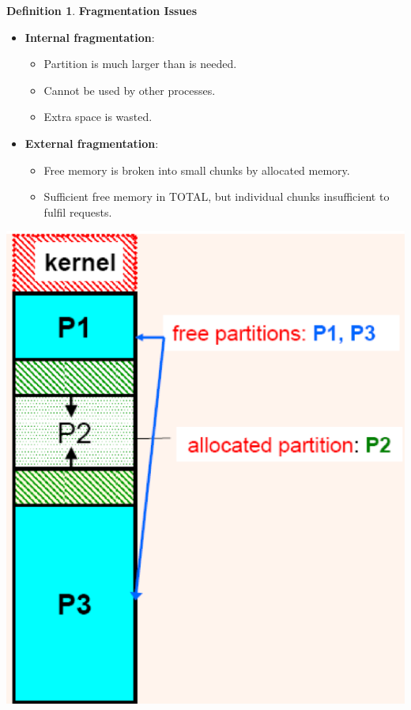 \documentclass[11pt,a4paper]{article}
\theoremstyle{definition}
\newtheorem{definition}{Definition}[section]
\newenvironment{myitemize}
{ \begin{itemize}
    \setlength{\itemsep}{5pt}
    \setlength{\parskip}{0pt}
    \setlength{\parsep}{0pt}     }
{ \end{itemize}                  }
\begin{document}
\begin{definition}{\textbf{Fragmentation Issues}}
	
\begin{minipage}{0.7\linewidth}
	\begin{myitemize}
		\item \textbf{Internal fragmentation}:
		\begin{myitemize}
			\item Partition is much larger than is needed.
			\item Cannot be used by other processes.
			\item Extra space is wasted.
		\end{myitemize}
		\item \textbf{External fragmentation}:
		\begin{myitemize}
			\item Free memory is broken into small chunks by allocated memory.
			\item Sufficient free memory in TOTAL, but individual chunks insufficient to fulfil requests.
		\end{myitemize}
	\end{myitemize}
\end{minipage}
\begin{minipage}{0.3\linewidth}
	\includegraphics[width=0.8\linewidth]{m4/fragmentationIssues}
\end{minipage}
\end{definition}
\end{document}
